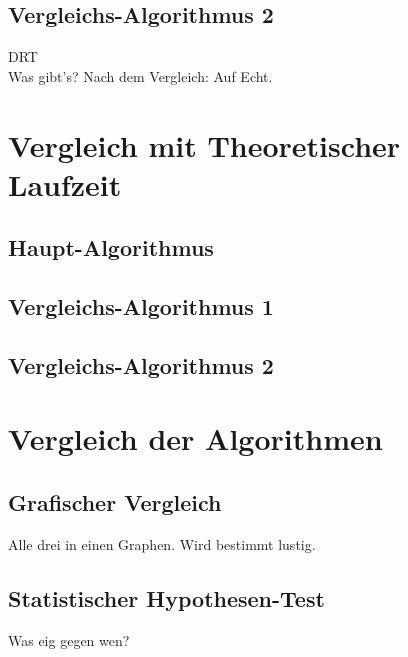 \documentclass[
10pt, %
a4paper, %
oneside, %
headinclude,footinclude, %
BCOR5mm, %
]{scrartcl}
\begin{document}
\subsection{Vergleichs-Algorithmus 2}
DRT\\
Was gibt's?
Nach dem Vergleich: Auf Echt.

\section{Vergleich mit Theoretischer Laufzeit}
\subsection{Haupt-Algorithmus}
\subsection{Vergleichs-Algorithmus 1}
\subsection{Vergleichs-Algorithmus 2}

\section{Vergleich der Algorithmen}
\subsection{Grafischer Vergleich}
Alle drei in einen Graphen. Wird bestimmt lustig.

\subsection{Statistischer Hypothesen-Test}
Was eig gegen wen?



\renewcommand{\refname}{\spacedlowsmallcaps{Literatur}} %




\end{document}
